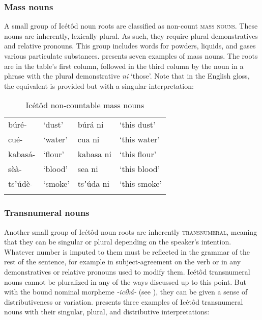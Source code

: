 \subsubsection{Mass nouns}\label{sec:4.2.5}

A small group of Icétôd noun roots are classified as non-count \textsc{mass} \textsc{nouns}. These nouns are inherently, lexically plural. As such, they require plural demonstratives and relative pronouns. This group includes words for powders, liquids, and gases various particulate substances.  presents seven examples of mass nouns. The roots are in the table's first column, followed in the third column by the noun in a phrase with the plural demonstrative \textit{ni} ‘those’. Note that in the English gloss, the equivalent is provided but with a singular interpretation:


\begin{table}
\caption{Icétôd non-countable mass nouns}
\label{tab:nouns:mass}
\begin{tabularx}{\textwidth}{XXXX}
\lsptoprule
búré- & ‘dust’ & búrá ni & ‘this dust’\\
cué- & ‘water’ & cua ni & ‘this water’\\
kabasá- & ‘flour’ & kabasa ni & ‘this flour’\\
sèà- & ‘blood’ & sea ni & ‘this blood’\\
tsʼúdè- & ‘smoke’ & tsʼúda ni & ‘this smoke’\\
\lspbottomrule
\end{tabularx}
\end{table}

\subsubsection{Transnumeral nouns}\label{sec:4.2.6}

Another small group of Icétôd noun roots are inherently \textsc{transnumeral}, meaning that they can be singular or plural depending on the speaker's intention. Whatever number is imputed to them must be reflected in the grammar of the rest of the sentence, for example in subject-agreement on the verb or in any demonstratives or relative pronouns used to modify them. Icétôd transnumeral nouns cannot be pluralized in any of the ways discussed up to this point. But with the bound nominal morpheme \textit{{}-icíká-} (see ), they can be given a sense of distributiveness or variation.  presents three examples of Icétôd transnumeral nouns with their singular, plural, and distributive interpretations:


